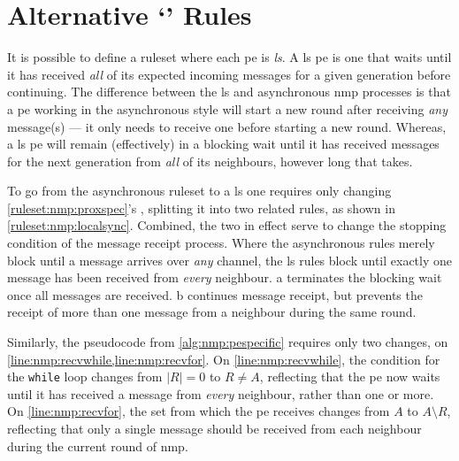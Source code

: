 \section{\label{sec:nmp:localsync}Alternative `' Rules}
It is possible to define a \gls{ruleset} where each \gls{pe} is \emph{\gls{ls}}.  A \gls{ls} \gls{pe} is one that waits until it has received \emph{all} of its expected incoming messages for a given generation before continuing.  The difference between the \gls{ls} and asynchronous \gls{nmp} processes is that a \gls{pe} working in the asynchronous style will start a new round after receiving \emph{any} message(s) --- it only needs to receive one before starting a new round.  Whereas, a \gls{ls} \gls{pe} will remain (effectively) in a blocking wait until it has received messages for the next generation from \emph{all} of its neighbours, however long that takes.

To go from the asynchronous \gls{ruleset} to a \gls{ls} one requires only changing \cref{ruleset:nmp:proxspec}'s , splitting it into two related rules, as shown in \cref{ruleset:nmp:localsync}.  Combined, the two in effect serve to change the stopping condition of the message receipt process.  Where the asynchronous rules merely block until a message arrives over \emph{any} channel, the \gls{ls} rules block until exactly one message has been received from \emph{every} neighbour.  a terminates the blocking wait once all messages are received.  b continues message receipt, but prevents the receipt of more than one message from a neighbour during the same round.

Similarly, the pseudocode from \cref{alg:nmp:pespecific} requires only two changes, on \cref{line:nmp:recvwhile,line:nmp:recvfor}.  On \cref{line:nmp:recvwhile}, the condition for the \texttt{while} loop changes from \(|R| = 0\) to \(R \not= A\), reflecting that the \gls{pe} now waits until it has received a message from \emph{every} neighbour, rather than one or more.  On \cref{line:nmp:recvfor}, the set from which the \gls{pe} receives changes from \(A\) to \(A \setminus R\), reflecting that only a single message should be received from each neighbour during the current round of \gls{nmp}.

